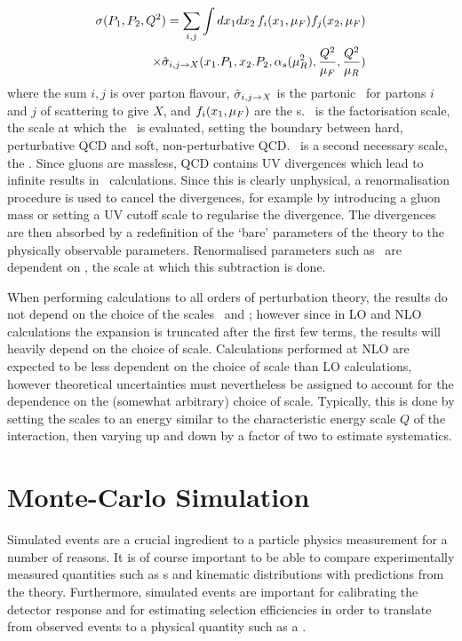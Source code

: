\begin{equation}
\begin{split}
\sigma(P_{1}, P_{2}, Q^{2}) = \sum_{i,j} \int dx_{1} dx_{2} \, f_{i}(x_{1}, \mu_{F})
f_{j}(x_{2}, \mu_{F}) \\
\times \hat{\sigma}_{i,j\rightarrow X} (x_{1}.P_{1}, x_{2}.P_{2}, \alpha_{s}(\mu_{R}^{2}), 
\frac{Q^{2}}{\mu_{F}}, \frac{Q^{2}}{\mu_{R}})
\end{split}
\end{equation}
where the sum $i,j$ is over parton flavour, 
$\hat{\sigma}_{i,j\rightarrow X}$ is the partonic \cx\ for partons $i$ and $j$ of
scattering to give $X$, and  $f_{i}(x_{1}, \mu_{F})$ are the \partDF s. \uF\ is the
factorisation scale, the scale at which the \partDF\ is evaluated, setting the boundary between hard, perturbative QCD and
soft, non-perturbative QCD. \uR\ is a second necessary scale, the
. Since gluons are massless, QCD contains UV
divergences which lead to infinite results in \cx\ calculations. Since 
this is clearly unphysical, a renormalisation procedure is used to cancel the
divergences, for example by introducing a gluon mass or setting a UV cutoff
scale to regularise the divergence. The divergences are then absorbed by a
redefinition of the `bare' parameters of the theory to the physically observable
parameters. Renormalised parameters such as \alphaS\ are dependent on \uR, the
scale at which this subtraction is done.

When performing calculations to all orders of perturbation theory, the results
do not depend on the choice of the scales \uR\ and \uF; however since in LO and NLO
calculations the expansion is truncated after the
first few terms,  the results will heavily depend on
the choice of scale. Calculations performed at NLO are expected to
be less dependent on the choice of scale than LO calculations, however
theoretical uncertainties must nevertheless be assigned to account for the dependence on the
(somewhat arbitrary) choice of scale. Typically, this is done by setting the
scales to an energy similar to the characteristic energy scale $Q$ of the interaction, then
varying up and down by a factor of two to estimate systematics.

\section{Monte-Carlo Simulation}
\label{sec:Theory-MC}

Simulated events are a crucial ingredient to a particle physics
measurement for a number of reasons. It is of course important to be able to
compare experimentally measured quantities such as \cx s and kinematic
distributions with predictions from the theory. Furthermore, simulated events
are important for calibrating the detector response and for estimating
selection efficiencies in order to translate from observed events
to a physical quantity such as a \cx. 

